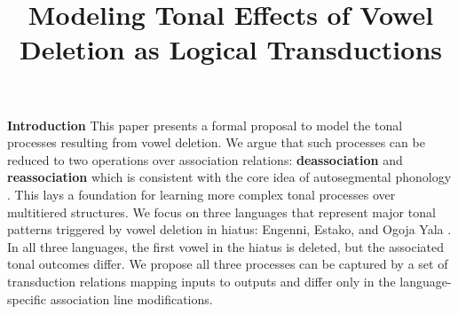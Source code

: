 \documentclass{article}[12pt]
\title{Modeling Tonal Effects of Vowel Deletion as Logical
Transductions}
\date{}
\begin{document}
\maketitle
\vspace{-2em}
\textbf{Introduction} This paper presents a formal proposal to 
model the tonal processes resulting from vowel deletion. We argue
that such processes can be reduced to two operations over 
association relations: \textbf{deassociation} and 
\textbf{reassociation} which is consistent with the core idea 
of autosegmental phonology \citep{goldsmith1976}. 
This lays a foundation for learning more complex tonal processes 
over multitiered structures.
We focus on three languages that represent major tonal 
patterns triggered by vowel deletion in hiatus: Engenni, 
Estako, and Ogoja Yala \citep{kao2017phonological}. In all 
three languages, the first vowel in the hiatus is deleted, 
but the associated tonal outcomes differ. We propose all 
three processes can be captured by a set of transduction 
relations mapping inputs to outputs and differ only in 
the language-specific association line modifications.
\end{document}

